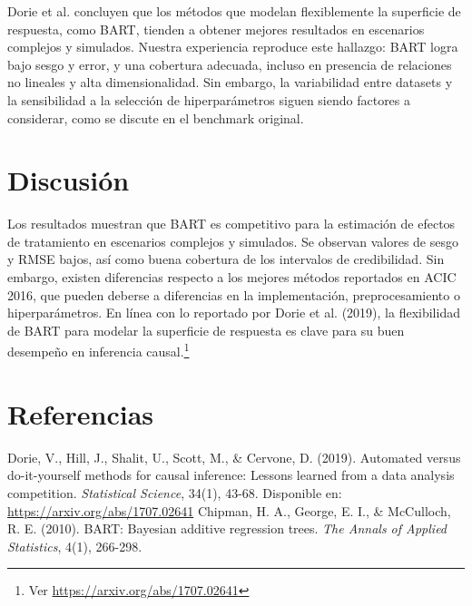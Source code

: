 \documentclass[a4paper,12pt]{article}
\begin{document}
Dorie et al. concluyen que los métodos que modelan flexiblemente la superficie de respuesta, como BART, tienden a obtener mejores resultados en escenarios complejos y simulados. Nuestra experiencia reproduce este hallazgo: BART logra bajo sesgo y error, y una cobertura adecuada, incluso en presencia de relaciones no lineales y alta dimensionalidad. Sin embargo, la variabilidad entre datasets y la sensibilidad a la selección de hiperparámetros siguen siendo factores a considerar, como se discute en el benchmark original.

\section{Discusión}
Los resultados muestran que BART es competitivo para la estimación de efectos de tratamiento en escenarios complejos y simulados. Se observan valores de sesgo y RMSE bajos, así como buena cobertura de los intervalos de credibilidad. Sin embargo, existen diferencias respecto a los mejores métodos reportados en ACIC 2016, que pueden deberse a diferencias en la implementación, preprocesamiento o hiperparámetros. En línea con lo reportado por Dorie et al. (2019), la flexibilidad de BART para modelar la superficie de respuesta es clave para su buen desempeño en inferencia causal.\footnote{Ver \url{https://arxiv.org/abs/1707.02641}}

\section{Referencias}
\begin{thebibliography}{9}
 Dorie, V., Hill, J., Shalit, U., Scott, M., \& Cervone, D. (2019). Automated versus do-it-yourself methods for causal inference: Lessons learned from a data analysis competition. \textit{Statistical Science}, 34(1), 43-68. Disponible en: \url{https://arxiv.org/abs/1707.02641}
 Chipman, H. A., George, E. I., \& McCulloch, R. E. (2010). BART: Bayesian additive regression trees. \textit{The Annals of Applied Statistics}, 4(1), 266-298.
\end{thebibliography}
\end{document}
